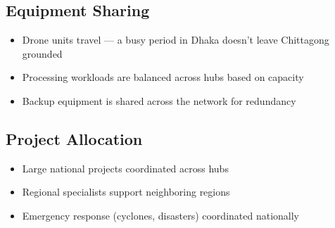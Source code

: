 \subsection{Equipment Sharing}

\begin{itemize}
    \item Drone units travel --- a busy period in Dhaka doesn't leave Chittagong grounded
    \item Processing workloads are balanced across hubs based on capacity
    \item Backup equipment is shared across the network for redundancy
\end{itemize}

\subsection{Project Allocation}

\begin{itemize}
    \item Large national projects coordinated across hubs
    \item Regional specialists support neighboring regions
    \item Emergency response (cyclones, disasters) coordinated nationally
\end{itemize}


